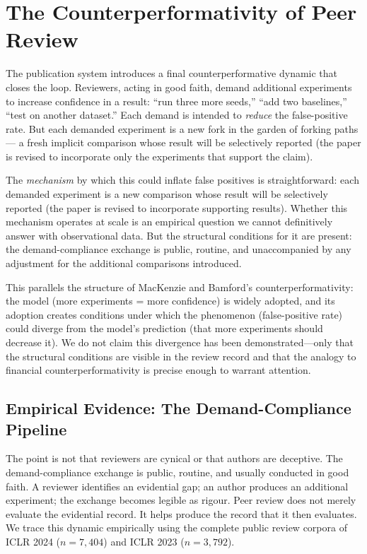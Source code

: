 \documentclass{article}
\begin{document}
\section{The Counterperformativity of Peer Review}
\label{sec:counterperformativity}

The publication system introduces a final counterperformative dynamic that closes the loop. Reviewers, acting in good faith, demand additional experiments to increase confidence in a result: ``run three more seeds,'' ``add two baselines,'' ``test on another dataset.'' Each demand is intended to \textit{reduce} the false-positive rate. But each demanded experiment is a new fork in the garden of forking paths --- a fresh implicit comparison whose result will be selectively reported (the paper is revised to incorporate only the experiments that support the claim).

The \textit{mechanism} by which this could inflate false positives is straightforward: each demanded experiment is a new comparison whose result will be selectively reported (the paper is revised to incorporate supporting results). Whether this mechanism operates at scale is an empirical question we cannot definitively answer with observational data. But the structural conditions for it are present: the demand-compliance exchange is public, routine, and unaccompanied by any adjustment for the additional comparisons introduced.

This parallels the structure of MacKenzie and Bamford's counterperformativity: the model (more experiments = more confidence) is widely adopted, and its adoption creates conditions under which the phenomenon (false-positive rate) could diverge from the model's prediction (that more experiments should decrease it). We do not claim this divergence has been demonstrated---only that the structural conditions are visible in the review record and that the analogy to financial counterperformativity is precise enough to warrant attention.

\subsection{Empirical Evidence: The Demand-Compliance Pipeline}

The point is not that reviewers are cynical or that authors are deceptive. The demand-compliance exchange is public, routine, and usually conducted in good faith. A reviewer identifies an evidential gap; an author produces an additional experiment; the exchange becomes legible as rigour. Peer review does not merely evaluate the evidential record. It helps produce the record that it then evaluates. We trace this dynamic empirically using the complete public review corpora of ICLR 2024 ($n = 7{,}404$) and ICLR 2023 ($n = 3{,}792$).
\end{document}
